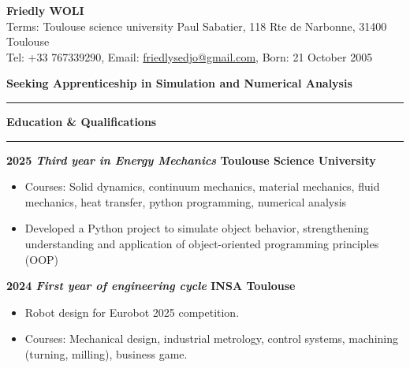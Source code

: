 \documentclass[9pt,a4paper]{article}
\begin{document}
	\pagestyle{empty}
	\begin{center}
		{\LARGE \textbf{Friedly WOLI}}\\[3pt]
		Terms: Toulouse science university Paul Sabatier, 118 Rte de Narbonne, 31400 Toulouse\\
		Tel: +33 767339290,\quad
		Email: \href{mailto:friedlysedjo@gmail.com}{friedlysedjo@gmail.com},\quad
		Born: 21 October 2005
	\end{center}
	
	
	\vspace{0.2cm}
	\begin{center}
		\textbf{\large Seeking Apprenticeship in Simulation and Numerical Analysis}
	\end{center}
	\vspace{0.2cm}

	
	\hrule
	\vspace{0.1cm}
	{\large \textbf{Education \& Qualifications}}
	\vspace{0.1cm}
	\hrule
	\vspace{0.1cm}
	
	\textbf{2025 \hfill \textit{Third year in Energy Mechanics}  \hfill Toulouse Science University} 
	
	\begin{itemize}
		\item Courses: Solid dynamics, continuum mechanics, material mechanics, fluid mechanics, heat transfer, python programming, numerical analysis
		\item Developed a Python project to simulate object behavior, strengthening understanding and application of object-oriented programming principles (OOP)
	\end{itemize}
	
	\vspace{0.1cm}
	
	\textbf{2024 \hfill \textit{First year of engineering cycle}   \hfill INSA Toulouse} 
	
	\begin{itemize}
		\item Robot design for Eurobot 2025 competition.
		\item Courses: Mechanical design, industrial metrology, control systems, machining (turning, milling), business game.
	\end{itemize}
	
	\vspace{0.1cm}
	
\end{document}
